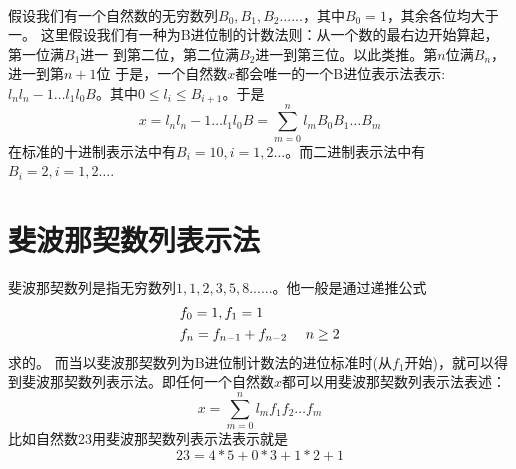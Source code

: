 \documentclass[UTF8,nofonts,cs4size]{ctexrep}
\begin{document}
\paragraph{}
假设我们有一个自然数的无穷数列$B_0,B_1,B_2......$，其中$B_0=1$，其余各位均大于一。
这里假设我们有一种为B进位制的计数法则：从一个数的最右边开始算起，第一位满$B_1$进一
到第二位，第二位满$B_2$进一到第三位。以此类推。第$n$位满$B_n$，进一到第$n+1$位
于是，一个自然数$x$都会唯一的一个B进位表示法表示:$l_nl_n-1\dots l_1l_{0}B$。其中$0 \leq l_i \leq B_{i+1}$。于是
\begin{equation}
x=l_nl_n-1\dots l_1l_{0}B=\sum_{m=0}^{n}{l_mB_0B_1\dots B_m}
\end{equation}
在标准的十进制表示法中有$B_i=10, i =1,2\dots $。而二进制表示法中有$B_i=2,i =1,2\dots $.
\section{斐波那契数列表示法}
斐波那契数列是指无穷数列$1,1,2,3,5,8......$。他一般是通过递推公式
\begin{align}
&f_0=1,f_1=1  \notag \\
&f_n=f_{n-1}+f_{n-2}\ \ \ \ n\geq 2 \notag
\end{align}
求的。
而当以斐波那契数列为B进位制计数法的进位标准时(从$f_1$开始)，就可以得到斐波那契数列表示法。即任何一个自然数$x$都可以用斐波那契数列表示法表述：
\[
x=\sum_{m=0}^{n}{l_mf_1f_2\dots f_m}
\]
比如自然数23用斐波那契数列表示法表示就是
\[
23=4*5+0*3+1*2+1
\]
\end{document}
